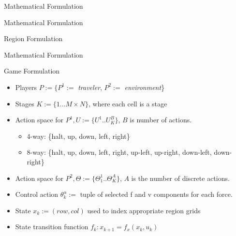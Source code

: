 \documentclass[xcolor=table, 9pt]{beamer}
\begin{document}
\begin{section}{Mathematical Formulation}
\begin{frame}{Mathematical Formulation}
\begin{block}{Region Formulation}
\begin{itemize}
            \end{itemize}
        \end{block}
    \end{frame}
    \begin{frame}{Mathematical Formulation}
        \begin{block}{Game Formulation}
            \begin{itemize}
            \item Players $P := \{P^1 :=$ \textit{traveler}, $P^2 :=$ \textit{environment}\}
            \item Stages $K := \{1 ... M \times N\}$, where each cell is a stage
            \item Action space for $P^1, U := \{U^1 .. U^B_K\}$, $B$ is number of actions. 
            \begin{itemize}
                \item 4-way: \{halt, up, down, left, right\}
                \item 8-way: \{halt, up, down, left, right, up-left, up-right, down-left, down-right\}
            \end{itemize}
            \item Action space for $P^2, \Theta := \{\Theta^1_1 .. \Theta^A_K\}$, $A$ is the number of discrete actions.
            \item Control action $\theta^\alpha_k := $ tuple of selected f and v components for each force.
            \item State $x_k := (row, col)$ used to index appropriate region grids
            \item State transition function $f_k : x_{k+1} = f_x(x_k, u_k)$
            \end{itemize}
        \end{block}
    \end{frame}    
    

\end{section}
\end{document}
